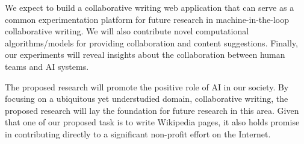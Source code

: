  We expect to build a collaborative writing web application that can serve as a common experimentation platform for future research in machine-in-the-loop collaborative writing.
We will also contribute novel computational algorithms/models for providing collaboration and content suggestions.
Finally, our experiments will reveal insights about the collaboration between human teams and AI systems.

 The proposed research will promote the positive role of AI in our society.
By focusing on a ubiquitous yet understudied domain, collaborative writing, the proposed research will lay the foundation for future research in this area.
Given that one of our proposed task is to write Wikipedia pages, it also holds promise in contributing directly to a significant non-profit effort on the Internet.